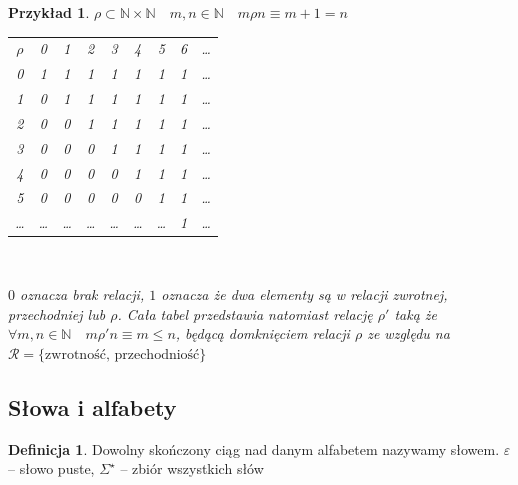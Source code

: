 \documentclass[12pt,a4paper]{article}
\newtheorem{przyklad}{Przykład}
\theoremstyle{definition}
\newtheorem{df}{Definicja}
\begin{document}
\begin{przyklad}
	$\rho \subset \mathbb{N}\times\mathbb{N} \quad m,n \in \mathbb{N} \quad m\rho n \equiv m +1 = n$ \\
	\begin{center}
	\begin{tabular}{ccccccccc}
		$\rho$ & 0 & 1 & 2 & 3 & 4 & 5 & 6 & \dots \\
			0  & {\color{red}1} & {\color{blue}1} & {\color{green}1}  & {\color{green}1}  & {\color{green}1}  & {\color{green}1}  & {\color{green}1}  & \dots \\
			1  & {\color{yellow}0}  & {\color{red}1}  & {\color{blue}1} & {\color{green}1}  & {\color{green}1}  & {\color{green}1}  & {\color{green}1}  & \dots \\
			2  & {\color{yellow}0}  & {\color{yellow}0}  & {\color{red}1}  & {\color{blue}1} & {\color{green}1}  &  {\color{green}1} & {\color{green}1}  & \dots \\
			3  & {\color{yellow}0}  & {\color{yellow}0}  & {\color{yellow}0}  & {\color{red}1}  & {\color{blue}1} & {\color{green}1}  & {\color{green}1}  & \dots \\
			4  & {\color{yellow}0}  & {\color{yellow}0}  & {\color{yellow}0}  & {\color{yellow}0}  & {\color{red}1}  & {\color{blue}1} & {\color{green}1}  & \dots \\
			5  & {\color{yellow}0}  & {\color{yellow}0}  & {\color{yellow}0}  & {\color{yellow}0}  & {\color{yellow}0}  & {\color{red}1}  & {\color{blue}1} & \dots \\
	     \dots & \dots  & \dots  & \dots  & \dots  & \dots  & \dots  & {\color{red}1}  & \dots \\
	\end{tabular}\\
	\end{center}	
	{\color{yellow} $0$ oznacza brak relacji}, $1$ oznacza że dwa elementy są w relacji {\color{red}zwrotnej}, {\color{green}przechodniej} lub {\color{blue}$\rho$}. 
	Cała tabel przedstawia natomiast relację $\rho'$ taką że $\forall m,n \in \mathbb{N} \quad m \rho' n \equiv m \leqslant n$,  będącą domknięciem relacji $\rho$ ze względu na 
	$\mathcal{R} = \{\text{zwrotność, przechodniość}\}$
\end{przyklad}

\subsection{Słowa i alfabety}
	\begin{df}
		Dowolny skończony ciąg nad danym alfabetem nazywamy słowem. $\varepsilon$ -- słowo puste, $\Sigma^\star$ -- zbiór wszystkich słów
	\end{df}
	
\end{document}
